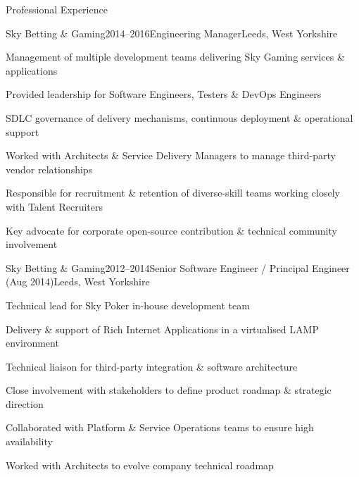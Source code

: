\documentclass{cv}
\begin{document}

\begin{rSection}{Professional Experience}


\begin{rSubsection}{Sky Betting \& Gaming}{2014--2016}{Engineering Manager}{Leeds, West Yorkshire}
\item Management of multiple development teams delivering Sky Gaming services \& applications
\item Provided leadership for Software Engineers, Testers \& DevOps Engineers
\item SDLC governance of delivery mechanisms, continuous deployment \& operational support
\item Worked with Architects \& Service Delivery Managers to manage third-party vendor relationships
\item Responsible for recruitment \& retention of diverse-skill teams working closely with Talent Recruiters
\item Key advocate for corporate open-source contribution \& technical community involvement
\end{rSubsection}


\begin{rSubsection}{Sky Betting \& Gaming}{2012--2014}{Senior Software Engineer / Principal Engineer (Aug 2014)}{Leeds, West Yorkshire}
\item Technical lead for Sky Poker in-house development team
\item Delivery \& support of Rich Internet Applications in a virtualised LAMP environment
\item Technical liaison for third-party integration \& software architecture
\item Close involvement with stakeholders to define product roadmap \& strategic direction
\item Collaborated with Platform \& Service Operations teams to ensure high availability
\item Worked with Architects to evolve company technical roadmap
\end{rSubsection}


\end{rSection}
\end{document}
